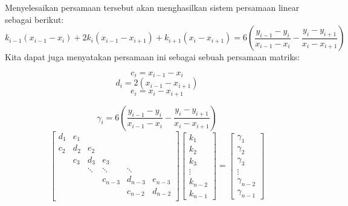\documentclass[journal,12pt,onecolumn,a4paper]{IEEEtran}
\begin{document}
Menyelesaikan persamaan tersebut akan menghasilkan sistem persamaan linear sebagai berikut:
\begin{equation}
	k_{i-1}(x_{i-1} - x_i) + 2k_i(x_{i-1} - x_{i+1}) + k_{i+1}(x_i - x_{i+1}) = 6(\frac{y_{i-1}-y_i}{x_{i-1}-x_i} - \frac{y_i-y_{i+1}}{x_i - x_{i+1}})
\end{equation}
Kita dapat juga menyatakan persamaan ini sebagai sebuah persamaan matriks:
\begin{multicols}{3}
	\noindent
	\begin{equation*}
		c_i = x_{i-1} - x_i
	\end{equation*}
	\begin{equation*}
		d_i = 2(x_{i-1} - x_{i+1})
	\end{equation*}
	\begin{equation*}
		e_i = x_i - x_{i+1}
	\end{equation*}
\end{multicols}
\begin{equation*}
	\gamma_i = 6(\frac{y_{i-1}-y_i}{x_{i-1}-x_i} - \frac{y_i-y_{i+1}}{x_i - x_{i+1}})
\end{equation*}
\begin{equation}
	\begin{bmatrix}
		d_1 & e_1 &        &         &         &         \\
		c_2 & d_2 & e_2    &         &         &         \\
		    & c_3 & d_3    & e_3     &         &         \\
		    &     & \ddots & \ddots  & \ddots  &         \\
		    &     &        & c_{n-3} & d_{n-3} & e_{n-3} \\
		    &     &        &         & c_{n-2} & d_{n-2} \\
	\end{bmatrix}
	\begin{bmatrix}
		k_1 \\k_2\\k_3\\\vdots\\k_{n-2}\\k_{n-1}
	\end{bmatrix}
	=
	\begin{bmatrix}
		\gamma_1 \\\gamma_2\\\gamma_3\\\vdots\\\gamma_{n-2}\\\gamma_{n-1}
	\end{bmatrix}
\end{equation}
\end{document}
